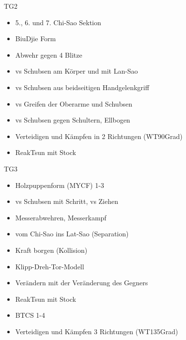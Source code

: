 \begin{WTGradTG}{2}{TG2}

\begin{itemize}
	\item 5., 6. und 7. Chi-Sao Sektion
	\item BiuDjie Form
	\item Abwehr gegen 4 Blitze
	\item vs Schubsen am K\"orper und mit Lan-Sao
	\item vs Schubsen aus beidseitigen Handgelenkgriff
	\item vs Greifen der Oberarme und Schubsen
	\item vs Schubsen gegen Schultern, Ellbogen
	\item Verteidigen und K\"ampfen in 2 Richtungen (WT90Grad)
	\item ReakTsun mit Stock
\end{itemize}
	
\end{WTGradTG}

\begin{WTGradTG}{3}{TG3}

\begin{itemize}
	\item Holzpuppenform (MYCF) 1-3
	\item vs Schubsen mit Schritt, vs Ziehen
	\item Messerabwehren, Messerkampf
	\item vom Chi-Sao ins Lat-Sao (Separation)
	\item Kraft borgen (Kollision)
	\item Klipp-Dreh-Tor-Modell
	\item Ver\"andern mit der Ver\"anderung des Gegners
	\item ReakTsun mit Stock
	\item BTCS 1-4
	\item Verteidigen und K\"ampfen 3 Richtungen (WT135Grad)
\end{itemize}
	
\end{WTGradTG}

